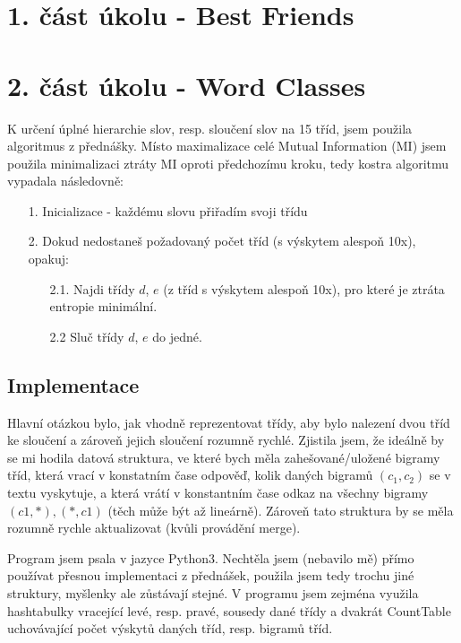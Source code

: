 \documentclass[12pt, a4paper]{report}
\theoremstyle{remark}
\begin{document}
\section*{1. část úkolu - Best Friends}

\noindent

\section*{2. část úkolu - Word Classes}

K určení úplné hierarchie slov, resp. sloučení slov na 15 tříd, jsem použila algoritmus z přednášky. Místo maximalizace celé Mutual Information (MI) jsem použila minimalizaci ztráty MI oproti předchozímu kroku, tedy kostra algoritmu vypadala následovně: 

\begin{itemize}
\item[1.] Inicializace - každému slovu přiřadím svoji třídu
\item[2.] Dokud nedostaneš požadovaný počet tříd (s výskytem alespoň 10x), opakuj:

        \begin{itemize}
        \item[2.1.] Najdi třídy $d$, $e$ (z tříd s výskytem alespoň 10x), pro které je ztráta entropie minimální.
        \item[2.2] Sluč třídy $d$, $e$ do jedné.
        \end{itemize}
\end{itemize}

\subsection*{Implementace}
Hlavní otázkou bylo, jak vhodně reprezentovat třídy, aby bylo nalezení dvou tříd ke sloučení a zároveň jejich sloučení rozumně rychlé. Zjistila jsem, že ideálně by se mi hodila datová struktura, ve které bych měla zahešované/uložené bigramy tříd, která vrací v konstatním čase odpověď, kolik daných bigramů $(c_1,c_2)$ se v textu vyskytuje, a která vrátí v konstantním čase odkaz na všechny bigramy $(c1,*),(*,c1)$ (těch může být až lineárně). Zároveň tato struktura by se měla rozumně rychle aktualizovat (kvůli provádění merge).

Program jsem psala v jazyce Python3. Nechtěla jsem (nebavilo mě) přímo používat přesnou implementaci z přednášek, použila jsem tedy trochu jiné struktury, myšlenky ale zůstávají stejné. V programu jsem zejména využila hashtabulky vracející levé, resp. pravé, sousedy dané třídy a dvakrát CountTable uchovávající počet výskytů daných tříd, resp. bigramů tříd.  
\end{document}
